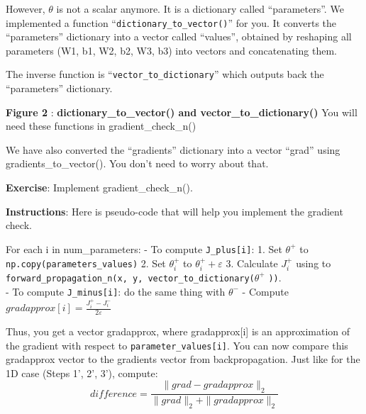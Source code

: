 \documentclass[11pt]{article}
\begin{document}
However, $\theta$ is not a scalar anymore. It is a dictionary called
``parameters''. We implemented a function
``\texttt{dictionary\_to\_vector()}'' for you. It converts the
``parameters'' dictionary into a vector called ``values'', obtained by
reshaping all parameters (W1, b1, W2, b2, W3, b3) into vectors and
concatenating them.

The inverse function is ``\texttt{vector\_to\_dictionary}'' which
outputs back the ``parameters'' dictionary.

 \textbf{Figure 2} : \textbf{dictionary\_to\_vector() and
vector\_to\_dictionary()} You will need these functions in
gradient\_check\_n()

We have also converted the ``gradients'' dictionary into a vector
``grad'' using gradients\_to\_vector(). You don't need to worry about
that.

\textbf{Exercise}: Implement gradient\_check\_n().

\textbf{Instructions}: Here is pseudo-code that will help you implement
the gradient check.

For each i in num\_parameters: - To compute \texttt{J\_plus{[}i{]}}: 1.
Set $\theta^{+}$ to \texttt{np.copy(parameters\_values)} 2. Set
$\theta^{+}_i$ to $\theta^{+}_i + \varepsilon$ 3. Calculate $J^{+}_i$
using to
\texttt{forward\_propagation\_n(x, y, vector\_to\_dictionary(}$\theta^{+}$
\texttt{))}.\\- To compute \texttt{J\_minus{[}i{]}}: do the same thing
with $\theta^{-}$ - Compute
$gradapprox[i] = \frac{J^{+}_i - J^{-}_i}{2 \varepsilon}$

Thus, you get a vector gradapprox, where gradapprox{[}i{]} is an
approximation of the gradient with respect to
\texttt{parameter\_values{[}i{]}}. You can now compare this gradapprox
vector to the gradients vector from backpropagation. Just like for the
1D case (Steps 1', 2', 3'), compute:
\[ difference = \frac {\| grad - gradapprox \|_2}{\| grad \|_2 + \| gradapprox \|_2 } \tag{3}\]
\end{document}
